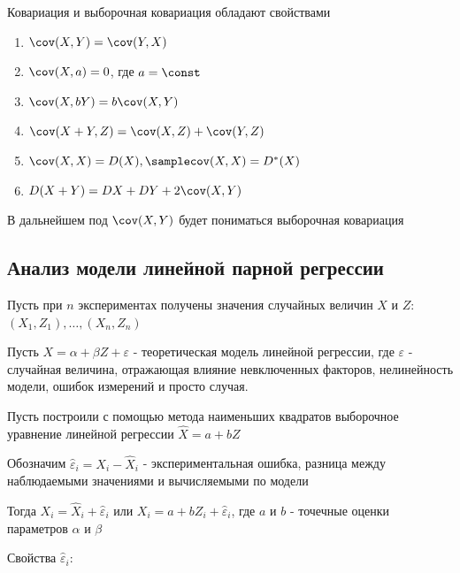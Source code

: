 \documentclass[12pt]{article}
\begin{document}
Ковариация и выборочная ковариация обладают свойствами

\begin{enumerate}
    \item $\cov (X, Y) = \cov (Y, X)$
    \item $\cov (X, a) = 0$, где $a = \const$
    \item $\cov (X, bY) = b \cov (X, Y)$
    \item $\cov (X + Y, Z) = \cov (X, Z) + \cov (Y, Z)$
    \item $\cov (X, X) = D(X), \samplecov (X, X) = D^* (X)$
    \item $D(X + Y) = DX + DY + 2\cov (X, Y)$
\end{enumerate}

\Nota В дальнейшем под $\cov (X, Y)$ будет пониматься выборочная ковариация

\subsection{Анализ модели линейной парной регрессии}

Пусть при $n$ экспериментах получены значения случайных величин $X$ и $Z$: $(X_1, Z_1), \dots, (X_n, Z_n)$

Пусть $X = \alpha + \beta Z + \varepsilon$ - теоретическая модель линейной регрессии, где $\varepsilon$ - случайная величина,
отражающая влияние невключенных факторов, нелинейность модели, ошибок измерений и просто случая.

Пусть построили с помощью метода наименьших квадратов выборочное уравнение линейной регрессии $\hat X = a + b Z$

Обозначим $\hat \varepsilon_i = X_i - \hat X_i$ - экспериментальная ошибка, разница между наблюдаемыми значениями и 
вычисляемыми по модели

Тогда $X_i = \hat X_i + \hat \varepsilon_i$ или $X_i = a + b Z_i + \hat \varepsilon_i$, где $a$ и $b$ - точечные оценки параметров $\alpha$ и $\beta$

Свойства $\hat \varepsilon_i$:
\end{document}
